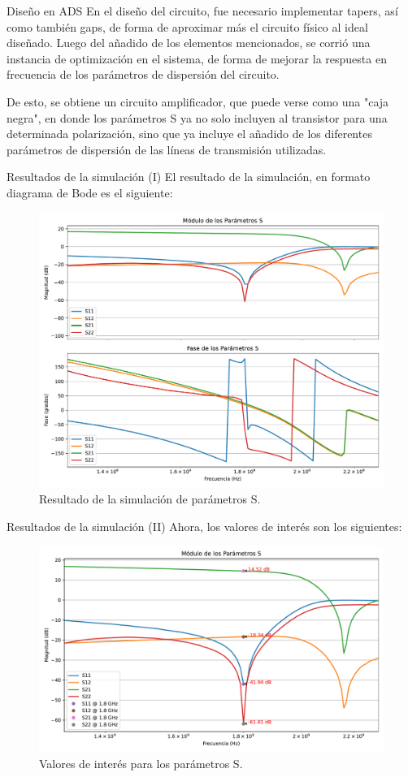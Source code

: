 \documentclass[9pt]{beamer}
\begin{document}
	\begin{frame}{Diseño en ADS}
		En el diseño del circuito, fue necesario implementar tapers, así como también gaps, de forma de aproximar más el circuito físico al ideal diseñado. Luego del añadido de los elementos mencionados, se corrió una instancia de optimización en el sistema, de forma de mejorar la respuesta en frecuencia de los parámetros de dispersión del circuito.
		
		De esto, se obtiene un circuito amplificador, que puede verse como una "caja negra", en donde los parámetros S ya no solo incluyen al transistor para una determinada polarización, sino que ya incluye el añadido de los diferentes parámetros de dispersión de las líneas de transmisión utilizadas.
	\end{frame}
	
	\begin{frame} {Resultados de la simulación (I)}
		El resultado de la simulación, en formato diagrama de Bode es el siguiente:
		\begin{figure}
			\centering
			\includegraphics[width=0.7\linewidth]{../s_result}
			\caption{Resultado de la simulación de parámetros S.}
			\label{fig:sresult}
		\end{figure}
		
	\end{frame}
	
	\begin{frame}{Resultados de la simulación (II)}
		Ahora, los valores de interés son los siguientes:
		\begin{figure}
			\centering
			\includegraphics[width=0.7\linewidth]{../s_marker}
			\caption{Valores de interés para los parámetros S.}
			\label{fig:smarker}
		\end{figure}
		
	\end{frame}
	
\end{document}
